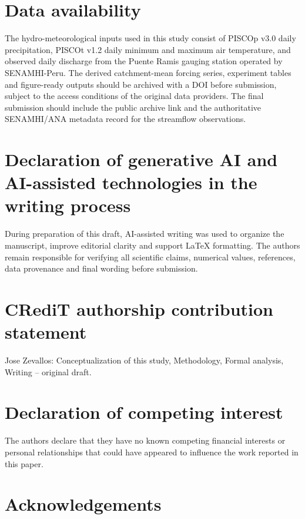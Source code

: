 \documentclass[a4paper,fleqn]{cas-sc}
\begin{document}
\section*{Data availability}

The hydro-meteorological inputs used in this study consist of PISCOp
v3.0 daily precipitation, PISCOt v1.2 daily minimum and maximum air
temperature, and observed daily discharge from the Puente Ramis gauging
station operated by SENAMHI-Peru. The derived catchment-mean forcing
series, experiment tables and figure-ready outputs should be archived
with a DOI before submission, subject to the access conditions of the
original data providers. The final submission should include the public
archive link and the authoritative SENAMHI/ANA metadata record for the
streamflow observations.

\section*{Declaration of generative AI and AI-assisted technologies
in the writing process}

During preparation of this draft, AI-assisted writing was used to
organize the manuscript, improve editorial clarity and support LaTeX
formatting. The authors remain
responsible for verifying all scientific claims, numerical values,
references, data provenance and final wording before submission.

\section*{CRediT authorship contribution statement}

Jose Zevallos: Conceptualization of this study, Methodology, Formal
analysis, Writing -- original draft.

\section*{Declaration of competing interest}

The authors declare that they have no known competing financial
interests or personal relationships that could have appeared to
influence the work reported in this paper.

\section*{Acknowledgements}

\printcredits




\end{document}
